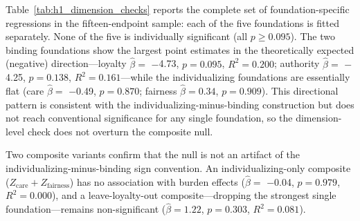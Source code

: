 Table~\ref{tab:h1_dimension_checks} reports the complete set of foundation-specific regressions in the fifteen-endpoint sample: each of the five foundations is fitted separately. None of the five is individually significant (all $p \geq 0.095$). The two binding foundations show the largest point estimates in the theoretically expected (negative) direction---loyalty $\hat{\beta}=$ $-$4.73, $p=0.095$, $R^2=0.200$; authority $\hat{\beta}=$ $-$4.25, $p=0.138$, $R^2=0.161$---while the individualizing foundations are essentially flat (care $\hat{\beta}=$ $-$0.49, $p=0.870$; fairness $\hat{\beta}=0.34$, $p=0.909$). This directional pattern is consistent with the individualizing-minus-binding construction but does not reach conventional significance for any single foundation, so the dimension-level check does not overturn the composite null.

Two composite variants confirm that the null is not an artifact of the individualizing-minus-binding sign convention. An individualizing-only composite ($Z_{\mathrm{care}} + Z_{\mathrm{fairness}}$) has no association with burden effects ($\hat{\beta}=$ $-$0.04, $p=0.979$, $R^2=0.000$), and a leave-loyalty-out composite---dropping the strongest single foundation---remains non-significant ($\hat{\beta}=1.22$, $p=0.303$, $R^2=0.081$).


